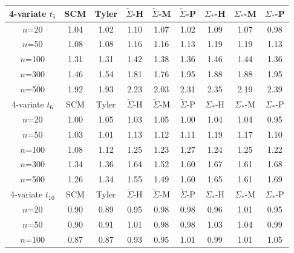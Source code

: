  \begin{table}[t]
\begin{scriptsize}
    \begin{tabular}{c|cc|ccc|ccc}
    \hline
    4-variate $t_5$    & SCM  & Tyler & $\tilde{\Sigma}$-H & $\tilde{\Sigma}$-M & $\tilde{\Sigma}$-P & ${\Sigma}_{*}$-H & ${\Sigma}_{*}$-M & ${\Sigma}_{*}$-P \\ \hline
    $n$=20             & 1.04 & 1.02  & 1.10   & 1.07   & 1.02  & 1.09    & 1.07    & 0.98   \\
    $n$=50             & 1.08 & 1.08  & 1.16   & 1.16   & 1.13  & 1.19    & 1.19    & 1.13   \\
    $n$=100            & 1.31 & 1.31  & 1.42   & 1.38   & 1.36  & 1.46    & 1.44    & 1.36   \\
    $n$=300            & 1.46 & 1.54  & 1.81   & 1.76   & 1.95  & 1.88    & 1.88    & 1.95   \\
    $n$=500            & 1.92 & 1.93  & 2.23   & 2.03   & 2.31  & 2.35    & 2.19    & 2.39   \\ \hline
    4-variate $t_6$     & SCM  & Tyler & $\tilde{\Sigma}$-H & $\tilde{\Sigma}$-M & $\tilde{\Sigma}$-P & ${\Sigma}_{*}$-H & ${\Sigma}_{*}$-M & ${\Sigma}_{*}$-P \\ \hline
    $n$=20             & 1.00 & 1.05  & 1.03   & 1.05   & 1.00  & 1.04    & 1.04    & 0.95   \\
    $n$=50             & 1.03 & 1.01  & 1.13   & 1.12   & 1.11  & 1.19    & 1.17    & 1.10   \\
    $n$=100            & 1.08 & 1.12  & 1.25   & 1.23   & 1.27  & 1.24    & 1.25    & 1.22   \\
    $n$=300            & 1.34 & 1.36  & 1.64   & 1.52   & 1.60  & 1.67    & 1.61    & 1.68   \\
    $n$=500            & 1.26 & 1.34  & 1.55   & 1.49   & 1.60  & 1.65    & 1.61    & 1.69   \\ \hline
    4-variate $t_{10}$ & SCM  & Tyler & $\tilde{\Sigma}$-H & $\tilde{\Sigma}$-M & $\tilde{\Sigma}$-P & ${\Sigma}_{*}$-H & ${\Sigma}_{*}$-M & ${\Sigma}_{*}$-P \\ \hline
    $n$=20             & 0.90 & 0.89  & 0.95   & 0.98   & 0.98  & 0.96    & 1.01    & 0.95   \\
    $n$=50             & 0.90 & 0.91  & 1.01   & 0.98   & 0.98  & 1.03    & 1.04    & 0.99   \\
    $n$=100            & 0.87 & 0.87  & 0.93   & 0.95   & 1.01  & 0.99    & 1.01    & 1.05   \\

\end{tabular}
\end{scriptsize}
\end{table}
